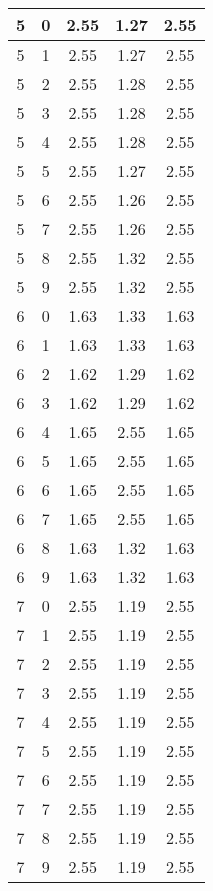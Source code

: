 \begin{longtable}{|c|c||c||c||c|}
	5 & 0 & 2.55 & 1.27 & 2.55 \\ \hline
	5 & 1 & 2.55 & 1.27 & 2.55 \\ \hline
	5 & 2 & 2.55 & 1.28 & 2.55 \\ \hline
	5 & 3 & 2.55 & 1.28 & 2.55 \\ \hline
	5 & 4 & 2.55 & 1.28 & 2.55 \\ \hline
	5 & 5 & 2.55 & 1.27 & 2.55 \\ \hline
	5 & 6 & 2.55 & 1.26 & 2.55 \\ \hline
	5 & 7 & 2.55 & 1.26 & 2.55 \\ \hline
	5 & 8 & 2.55 & 1.32 & 2.55 \\ \hline
	5 & 9 & 2.55 & 1.32 & 2.55 \\ \hline
	6 & 0 & 1.63 & 1.33 & 1.63 \\ \hline
	6 & 1 & 1.63 & 1.33 & 1.63 \\ \hline
	6 & 2 & 1.62 & 1.29 & 1.62 \\ \hline
	6 & 3 & 1.62 & 1.29 & 1.62 \\ \hline
	6 & 4 & 1.65 & 2.55 & 1.65 \\ \hline
	6 & 5 & 1.65 & 2.55 & 1.65 \\ \hline
	6 & 6 & 1.65 & 2.55 & 1.65 \\ \hline
	6 & 7 & 1.65 & 2.55 & 1.65 \\ \hline
	6 & 8 & 1.63 & 1.32 & 1.63 \\ \hline
	6 & 9 & 1.63 & 1.32 & 1.63 \\ \hline
	7 & 0 & 2.55 & 1.19 & 2.55 \\ \hline
	7 & 1 & 2.55 & 1.19 & 2.55 \\ \hline
	7 & 2 & 2.55 & 1.19 & 2.55 \\ \hline
	7 & 3 & 2.55 & 1.19 & 2.55 \\ \hline
	7 & 4 & 2.55 & 1.19 & 2.55 \\ \hline
	7 & 5 & 2.55 & 1.19 & 2.55 \\ \hline
	7 & 6 & 2.55 & 1.19 & 2.55 \\ \hline
	7 & 7 & 2.55 & 1.19 & 2.55 \\ \hline
	7 & 8 & 2.55 & 1.19 & 2.55 \\ \hline
	7 & 9 & 2.55 & 1.19 & 2.55 \\ \hline
\end{longtable}

